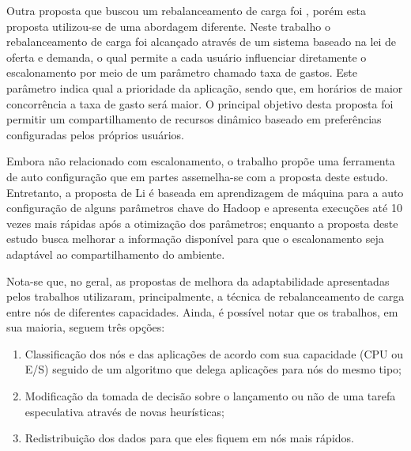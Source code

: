 Outra proposta que buscou um rebalanceamento de carga foi \cite{Sandholm2009}, porém esta proposta utilizou-se de uma abordagem diferente. Neste trabalho o rebalanceamento de carga foi alcançado através de um sistema baseado na lei de oferta e demanda, o qual permite a cada usuário influenciar diretamente o escalonamento por meio de um parâmetro chamado taxa de gastos. Este parâmetro indica qual a prioridade da aplicação, sendo que, em horários de maior concorrência a taxa de gasto será maior. O principal objetivo desta proposta foi permitir um compartilhamento de recursos dinâmico baseado em preferências configuradas pelos próprios usuários.

Embora não relacionado com escalonamento, o trabalho \cite{Li} propõe uma ferramenta de auto configuração que em partes assemelha-se com a proposta deste estudo. Entretanto, a proposta de Li é baseada em aprendizagem de máquina para a auto configuração de alguns parâmetros chave do Hadoop e apresenta execuções até 10 vezes mais rápidas após a otimização dos parâmetros; enquanto a proposta deste estudo busca melhorar a informação disponível para que o escalonamento seja adaptável ao compartilhamento do ambiente.

Nota-se que, no geral, as propostas de melhora da adaptabilidade apresentadas pelos trabalhos utilizaram, principalmente, a técnica de rebalanceamento de carga entre nós de diferentes capacidades. Ainda, é possível notar que os trabalhos, em sua maioria, seguem três opções:

\begin{enumerate}
	\item Classificação dos nós e das aplicações de acordo com sua capacidade (CPU ou E/S) seguido de um algoritmo que delega aplicações para nós do mesmo tipo;
	\item Modificação da tomada de decisão sobre o lançamento ou não de uma tarefa especulativa através de novas heurísticas;
	\item Redistribuição dos dados para que eles fiquem em nós mais rápidos.
\end{enumerate}

